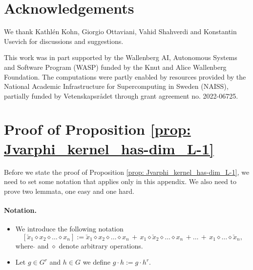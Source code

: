 \documentclass[final]{article}
\theoremstyle{definition}
\theoremstyle{plain}
\begin{document}
\section*{Acknowledgements}
We thank  Kathl\'en Kohn,  Giorgio Ottaviani, Vahid Shahverdi and Konstantin Usevich  for discussions and suggestions. 

This work was in part supported by the Wallenberg AI, Autonomous Systems and Software Program (WASP)
funded by the Knut and Alice Wallenberg Foundation.
The computations were partly
enabled by resources provided by the National Academic Infrastructure for Supercomputing in Sweden
(NAISS), partially funded by Vetenskapsrådet through grant agreement no. 2022-06725.








\appendix

\section{Proof of Proposition \ref{prop: Jvarphi_kernel_has-dim_L-1}}\label{appendix: varph_is_regular}

Before we state the proof of Proposition \ref{prop: Jvarphi_kernel_has-dim_L-1}, we need to set some notation that applies only in this appendix. We also need to prove two lemmata, one easy and one hard.



\paragraph{Notation.}
\begin{itemize}
    \item We introduce the following notation
    \[
    [\breve{x}_1 \diamond x_2 \diamond\hdots\diamond x_n] := \breve{x}_1 \diamond x_2\diamond \hdots\diamond x_n 
    \, +  \,
    x_1 \diamond\breve{x}_2 \diamond\hdots\diamond x_n \, + \hdots \, + \,
    x_1 \diamond\hdots\diamond \breve{x}_n,
    \]
    where $\breve{}$ and $\diamond$ denote arbitrary operations.
    \item  Let $g \in G^{r}$ and $h\in G$ we define $g\cdot h := g \cdot h^r$.
\end{itemize}
\end{document}

